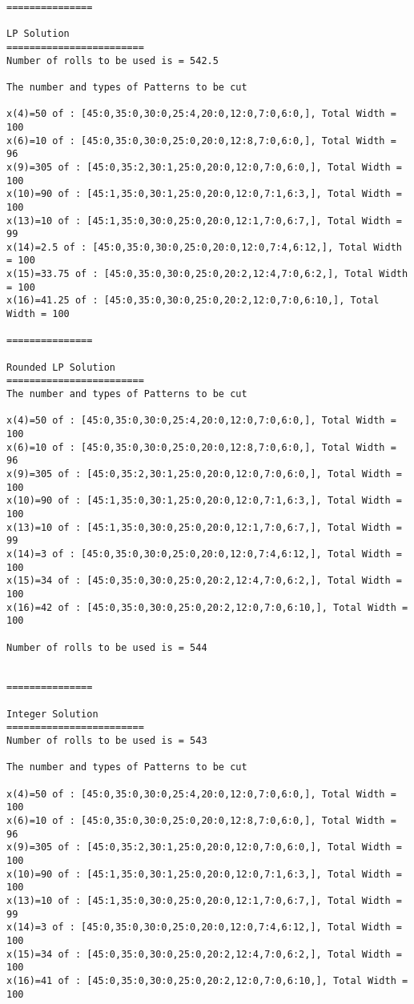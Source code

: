 \documentclass[twoside,12pt]{article}
\begin{document}
\begin{verbatim}
===============

LP Solution
========================
Number of rolls to be used is = 542.5

The number and types of Patterns to be cut

x(4)=50 of : [45:0,35:0,30:0,25:4,20:0,12:0,7:0,6:0,], Total Width = 100
x(6)=10 of : [45:0,35:0,30:0,25:0,20:0,12:8,7:0,6:0,], Total Width = 96
x(9)=305 of : [45:0,35:2,30:1,25:0,20:0,12:0,7:0,6:0,], Total Width = 100
x(10)=90 of : [45:1,35:0,30:1,25:0,20:0,12:0,7:1,6:3,], Total Width = 100
x(13)=10 of : [45:1,35:0,30:0,25:0,20:0,12:1,7:0,6:7,], Total Width = 99
x(14)=2.5 of : [45:0,35:0,30:0,25:0,20:0,12:0,7:4,6:12,], Total Width = 100
x(15)=33.75 of : [45:0,35:0,30:0,25:0,20:2,12:4,7:0,6:2,], Total Width = 100
x(16)=41.25 of : [45:0,35:0,30:0,25:0,20:2,12:0,7:0,6:10,], Total Width = 100

===============

Rounded LP Solution
========================
The number and types of Patterns to be cut

x(4)=50 of : [45:0,35:0,30:0,25:4,20:0,12:0,7:0,6:0,], Total Width = 100
x(6)=10 of : [45:0,35:0,30:0,25:0,20:0,12:8,7:0,6:0,], Total Width = 96
x(9)=305 of : [45:0,35:2,30:1,25:0,20:0,12:0,7:0,6:0,], Total Width = 100
x(10)=90 of : [45:1,35:0,30:1,25:0,20:0,12:0,7:1,6:3,], Total Width = 100
x(13)=10 of : [45:1,35:0,30:0,25:0,20:0,12:1,7:0,6:7,], Total Width = 99
x(14)=3 of : [45:0,35:0,30:0,25:0,20:0,12:0,7:4,6:12,], Total Width = 100
x(15)=34 of : [45:0,35:0,30:0,25:0,20:2,12:4,7:0,6:2,], Total Width = 100
x(16)=42 of : [45:0,35:0,30:0,25:0,20:2,12:0,7:0,6:10,], Total Width = 100

Number of rolls to be used is = 544


===============

Integer Solution
========================
Number of rolls to be used is = 543

The number and types of Patterns to be cut

x(4)=50 of : [45:0,35:0,30:0,25:4,20:0,12:0,7:0,6:0,], Total Width = 100
x(6)=10 of : [45:0,35:0,30:0,25:0,20:0,12:8,7:0,6:0,], Total Width = 96
x(9)=305 of : [45:0,35:2,30:1,25:0,20:0,12:0,7:0,6:0,], Total Width = 100
x(10)=90 of : [45:1,35:0,30:1,25:0,20:0,12:0,7:1,6:3,], Total Width = 100
x(13)=10 of : [45:1,35:0,30:0,25:0,20:0,12:1,7:0,6:7,], Total Width = 99
x(14)=3 of : [45:0,35:0,30:0,25:0,20:0,12:0,7:4,6:12,], Total Width = 100
x(15)=34 of : [45:0,35:0,30:0,25:0,20:2,12:4,7:0,6:2,], Total Width = 100
x(16)=41 of : [45:0,35:0,30:0,25:0,20:2,12:0,7:0,6:10,], Total Width = 100
\end{verbatim}
\end{document}

